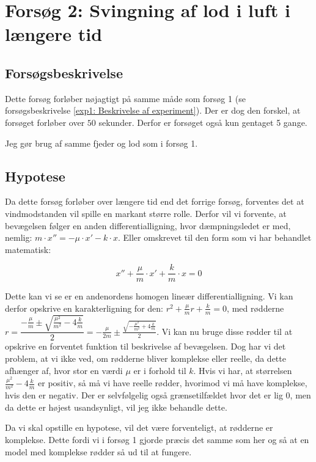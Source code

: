 \section{Forsøg 2: Svingning af lod i luft i længere tid}

\subsection{Forsøgsbeskrivelse}
Dette forsøg forløber nøjagtigt på samme måde som forsøg 1 (se forsøgsbeskrivelse \ref{exp1: Beskrivelse af experiment}).
Der er dog den forskel, at forsøget forløber over $50$ sekunder. 
Derfor er forsøget også kun gentaget 5 gange. 

Jeg gør brug af samme fjeder og lod som i forsøg 1.

\subsection{Hypotese}\label{exp2: Hypotese}
Da dette forsøg forløber over længere tid end det forrige forsøg, forventes det at vindmodstanden vil spille en markant større rolle. 
Derfor vil vi forvente, at bevægelsen følger en anden differentialligning, hvor dæmpningsledet er med, nemlig:
$m\cdot x''= -\mu \cdot x' - k\cdot x$.
Eller omskrevet til den form som vi har behandlet matematisk:

$$x''+ \frac{\mu}{m} \cdot x' + \frac{k}{m}\cdot x=0$$

Dette kan vi  se er en andenordens homogen lineær differentialligning.
Vi kan derfor opskrive en karakterligning for den:
$r^2 + \frac{\mu}{m} r + \frac{k}{m} = 0$, med rødderne $r = \dfrac{-\frac{\mu}{m} \pm \sqrt{\frac{\mu^2}{m^2}-4\frac{k}{m}}}{2}=
-\frac{\mu}{2m}  \pm   \frac{\sqrt{-\frac{\mu^2}{m^2}+4\frac{k}{m}}}{2}$.
Vi kan nu bruge disse rødder til at opskrive en forventet funktion til beskrivelse af bevægelsen. 
Dog har vi det problem, at vi ikke ved, om rødderne bliver komplekse eller reelle, da dette afhænger af, hvor stor en værdi $\mu$ er i forhold til $k$.
Hvis vi har, at størrelsen $\frac{\mu^2}{m^2}-4\frac{k}{m}$ er positiv, så må vi have reelle rødder, hvorimod vi må have komplekse, hvis den er negativ. 
Der er selvfølgelig også grænsetilfældet hvor det er lig $0$, men da dette er højest usandsynligt, vil jeg ikke behandle dette. 

Da vi skal opstille en hypotese, vil det være forventeligt, at rødderne er komplekse. 
Dette fordi vi i forsøg 1 gjorde præcis det samme som her og så at en model med komplekse rødder så ud til at fungere. 

